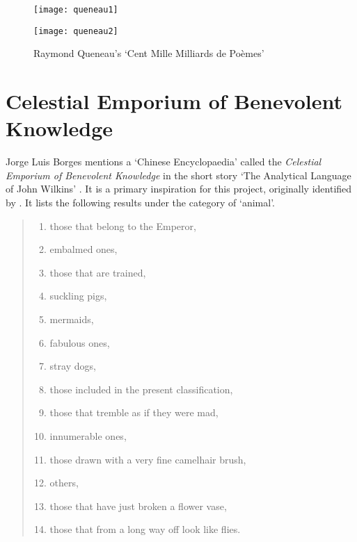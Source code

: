 \begin{figure}[h!]
\centering
\begin{minipage}{.45\linewidth}
  \texttt{[image: queneau1]}
\end{minipage}
\hspace{.05\linewidth}
\begin{minipage}{.45\linewidth}
  \texttt{[image: queneau2]}
\end{minipage}
\caption[Queneau's `Cent Mille Milliards de Poèmes']{Raymond Queneau's `Cent Mille Milliards de Poèmes'\footnotemark}
\label{fig:queneau12}
\end{figure}


\section{Celestial Emporium of Benevolent Knowledge}
\label{s:borges}

Jorge Luis Borges mentions a `Chinese Encyclopaedia' called the \emph{Celestial Emporium of Benevolent Knowledge} in the short story `The Analytical Language of John Wilkins' \citeyear{Borges2000}. It is a primary inspiration for this project, originally identified by \autocite{Hendler2011, Hendler2013}. It lists the following results under the category of `animal'.

\begin{quotation}
\begin{enumerate}
  \item those that belong to the Emperor,
  \item embalmed ones,
  \item those that are trained,
  \item suckling pigs,
  \item mermaids,
  \item fabulous ones,
  \item stray dogs,
  \item those included in the present classification,
  \item those that tremble as if they were mad,
  \item innumerable ones,
  \item those drawn with a very fine camelhair brush,
  \item others,
  \item those that have just broken a flower vase,
  \item those that from a long way off look like flies.
\end{enumerate}
\end{quotation}

